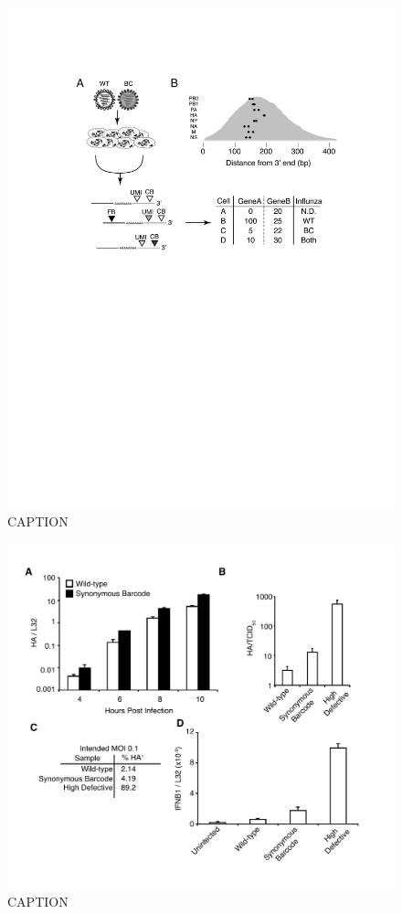 \documentclass[9pt,lineno]{elife}
\begin{document}
\begin{figure}
\includegraphics[width=0.8\linewidth]{figures/Workflow/workflow.pdf}
\caption{
CAPTION}
\label{fig:workflow}
\end{figure}

\begin{figure}
\includegraphics[width=0.7\linewidth]{figures/Validating_barcode_virus/validating_populations_D02.pdf}
\caption{
CAPTION}
\label{fig:viruspopulations}
\end{figure}
\end{document}
